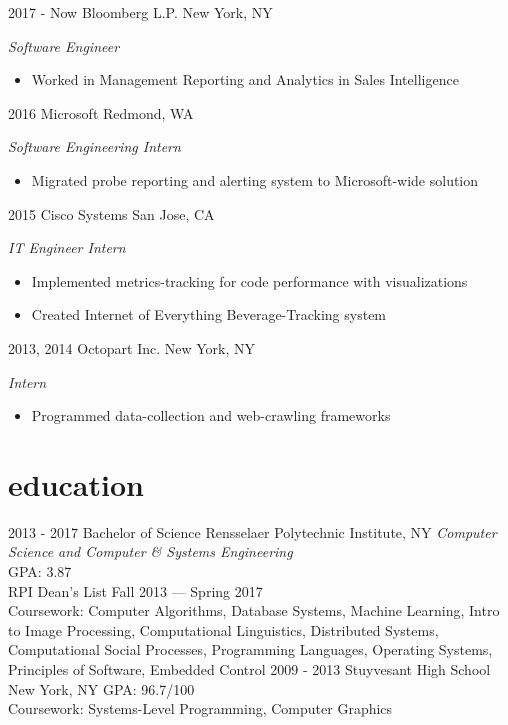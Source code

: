 \documentclass[]{friggeri-cv}
\begin{document}
\begin{entrylist}
  \entry
    {2017 - Now}
    {Bloomberg L.P.}
    {New York, NY}
    {\emph{Software Engineer}
    \begin{itemize}
        \item Worked in Management Reporting and Analytics in Sales Intelligence
    \end{itemize}
    }
  \entry
    {2016}
    {Microsoft}
    {Redmond, WA}
    {\emph{Software Engineering Intern}
    \begin{itemize}
        \item Migrated probe reporting and alerting system to Microsoft-wide solution
    \end{itemize}
    }
  \entry
    {2015}
    {Cisco Systems}
    {San Jose, CA}
    {\emph{IT Engineer Intern}
    \begin{itemize}
        \item Implemented metrics-tracking for code performance with visualizations
        \item Created Internet of Everything Beverage-Tracking system
    \end{itemize}
    }
  \entry
    {2013, 2014}
    {Octopart Inc.}
    {New York, NY}
    {\emph{Intern}
    \begin{itemize}
        \item Programmed data-collection and web-crawling frameworks
    \end{itemize}
    }
\end{entrylist}

\section{education}

\begin{entrylist}
  \entry
    {2013 - 2017}
    {Bachelor of Science}
    {Rensselaer Polytechnic Institute, NY}
    {\emph{Computer Science and Computer \& Systems Engineering}\\
    GPA: 3.87\\
    RPI Dean's List Fall 2013 --- Spring 2017\\
    Coursework: Computer Algorithms, Database Systems, Machine Learning, Intro to Image Processing, Computational Linguistics, Distributed Systems, Computational Social Processes, Programming Languages, Operating Systems, Principles of Software, Embedded Control}
  \entry
    {2009 - 2013}
    {Stuyvesant High School}
    {New York, NY}
    {GPA: 96.7/100\\
    Coursework: Systems-Level Programming, Computer Graphics}
\end{entrylist}
\end{document}
